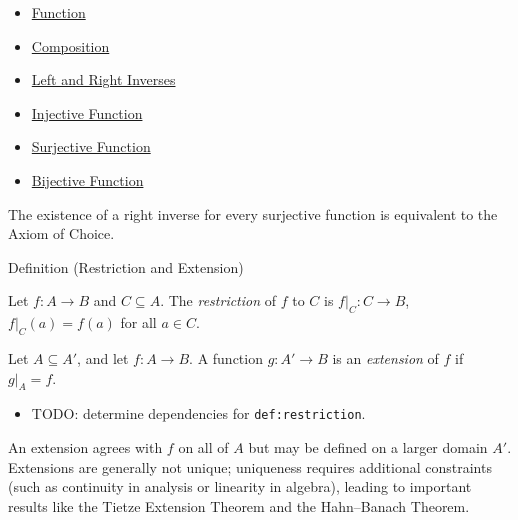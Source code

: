 \begin{dependencies}
\begin{itemize}
  \item \hyperref[def:function]{Function}
  \item \hyperref[def:composition]{Composition}
  \item \hyperref[def:left-right-inverse]{Left and Right Inverses}
  \item \hyperref[def:injective]{Injective Function}
  \item \hyperref[def:surjective]{Surjective Function}
  \item \hyperref[def:bijective]{Bijective Function}
\end{itemize}
\end{dependencies}

\begin{remark*}
The existence of a right inverse for every surjective function is equivalent
to the Axiom of Choice.
\end{remark*}

\begin{definitionbox}{Definition (Restriction and Extension)}
\begin{definition}\label{def:restriction}
Let $f : A \to B$ and $C \subseteq A$. The \emph{restriction} of $f$ to $C$
is $f|_C : C \to B$, $f|_C(a) = f(a)$ for all $a \in C$.

Let $A \subseteq A'$, and let $f : A \to B$. A function $g : A' \to B$ is an
\emph{extension} of $f$ if $g|_A = f$.
\end{definition}
\end{definitionbox}

\begin{dependencies}
\begin{itemize}
  \item TODO: determine dependencies for \texttt{def:restriction}.
\end{itemize}
\end{dependencies}

\begin{remark*}
\label{def:fn-extension}
An extension agrees with $f$ on all of $A$ but may be defined on a larger
domain $A'$. Extensions are generally not unique; uniqueness requires additional
constraints (such as continuity in analysis or linearity in algebra), leading to
important results like the Tietze Extension Theorem and the Hahn--Banach
Theorem.
\end{remark*}

